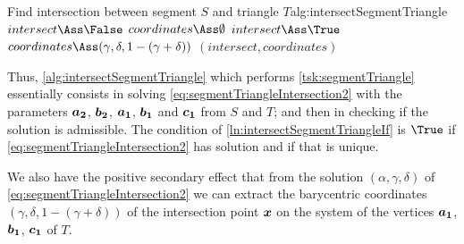 \documentclass[dissertation.tex]{subfiles}
\begin{document}
\begin{algo}{Find intersection between segment $S$ and triangle $T$}{alg:intersectSegmentTriangle}
  \State $intersect\Ass\False$
  \State $coordinates\Ass\emptyset$
  \label{ln:intersectSegmentTriangleIf}
  \State $intersect\Ass\True$
  \State $coordinates\Ass(\gamma, \delta, 1-(\gamma+\delta))$
  \EndIf
  \EndIf
  \State\Return $(intersect, coordinates)$
  \EndFunction
\end{algo}
Thus, \cref{alg:intersectSegmentTriangle} which performs
\cref{tsk:segmentTriangle} 
essentially consists in solving
\cref{eq:segmentTriangleIntersection2} with the parameters $\boldsymbol{a_2}$,
$\boldsymbol{b_2}$, $\boldsymbol{a_1}$, $\boldsymbol{b_1}$ and $\boldsymbol{c_1}$ from $S$ and $T$;
and then in checking if the solution is admissible. The condition of
\cref{ln:intersectSegmentTriangleIf} is $\True$ if
\cref{eq:segmentTriangleIntersection2} has solution and if that
is unique.

We also have the positive secondary effect that from the solution
$(\alpha,\gamma,\delta)$ of \cref{eq:segmentTriangleIntersection2} we
can extract the barycentric coordinates $(\gamma, \delta,
1-(\gamma+\delta))$ of the intersection point $\boldsymbol{x}$ on the system of
the vertices $\boldsymbol{a_1}$, $\boldsymbol{b_1}$, $\boldsymbol{c_1}$ of $T$.
\end{document}
